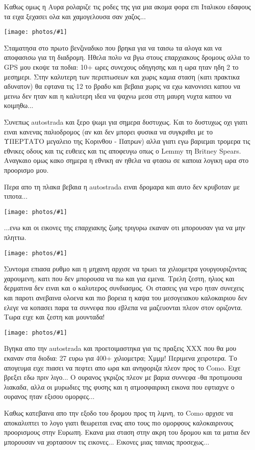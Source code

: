 \documentclass[]{book}
\newcommand\photo[1]{\noindent\texttt{[image: photos/\#1]}}
\begin{document}
Καθως ομως η Αυρα ρολαριζε τις ροδες της για μια ακομα φορα επι Ιταλικου εδαφους τα ειχα ξεχασει ολα και χαμογελουσα σαν χαζος...

\photo{8.jpg}

Σταματησα στο πρωτο βενζιναδικο που βρηκα για να ταισω τα αλογα και να αποφασισω για τη διαδρομη. Ηθελα πολυ να βγω στους επαρχιακους δρομους αλλα το GPS μου εκοψε τα ποδια: 10+ ωρες συνεχους οδηγησης και η ωρα ηταν ηδη 2 το μεσημερι. Στην καλυτερη των περιπτωσεων και χωρις καμια σταση (κατι πρακτικα αδυνατον) θα εφτανα τις 12 το βραδυ και βεβαια χωρις να εχω κανονισει καπου να μεινω δεν ηταν και η καλυτερη ιδεα να ψαχνω μεσα στη μαυρη νυχτα καπου να κοιμηθω...

Συνεπως autostrada και ξερο ψωμι για σημερα δυστυχως.
Και το δυστυχως οχι γιατι ειναι κανενας παλιοδρομος (αν και δεν μπορει φυσικα να συγκριθει με το ΥΠΕΡΤΑΤΟ μεγαλειο της Κορινθου - Πατρων) αλλα γιατι εγω βαριεμαι τρομερα τις εθνικες οδους και τις ευθειες και τις αποφευγω οπως ο Lemmy τη Britney Spears. Αναγκαιο ομως κακο σημερα η εθνικη αν ηθελα να φτασω σε καποια λογικη ωρα στο προορισμο μου.

Περα απο τη πλακα βεβαια η autostrada ειναι δρομαρα και αυτο δεν κρυβοταν με τιποτα...

\photo{9.jpg}

...ενω και οι εικονες της επαρχιακης ζωης τριγυρω εκαναν οτι μπορουσαν για να μην πληττω.

\photo{10.jpg}

Συντομα επιασα ρυθμο και η μηχανη αρχισε να τρωει τα χιλιομετρα γουργουριζοντας χαρουμενη, κατι που δεν μπορουσα να πω και για εμενα. Τρελη ζεστη, ηλιος και δερματινα δεν ειναι και ο καλυτερος συνδιασμος. 
Οι στασεις για νερο ηταν συνεχεις και παροτι ανεβαινα ολοενα και πιο βορεια η καψα του μεσογειακου καλοκαιριου δεν ελεγε να κοπασει παρα τα συννεφα που εβλεπα να μαζευονται πλεον στον οριζοντα. 
Τωρα ειχε και ζεστη και μουνταδα!

\photo{11.jpg}

Βγηκα απο την autostrada και προετοιμαστηκα για τις πραξεις ΧΧΧ που θα μου εκαναν στα διοδια: 27 ευρω για 400+ χιλιομετρα; Χμμμ! Περιμενα χειροτερα.
Το απογευμα ειχε πιασει να πεφτει απο ωρα και ανηφοριζα πλεον προς το Como. Ειχε βρεξει εδω πριν λιγο... Ο ουρανος γκριζος πλεον με βαρια συννεφα -θα προτιμουσα λιακαδα, αλλα οι μυρωδιες της φυσης και η ατμοσφαιρικη εικονα που εφτιαχνε ο ουρανος ηταν εξισου ομορφες...

Καθως κατεβαινα απο την εξοδο του δρομου προς τη λιμνη, το Como αρχισε να αποκαλυπτει το λογο γιατι θεωρειται ενας απο τους πιο ομορφους καλοκαιρινους προορισμους στην Ευρωπη.
Εκανα μια σταση στην ακρη του δρομου και τα ματια δεν μπορουσαν να χορτασουν τις εικονες...
Εικονες μιας ταινιας προσεχως...
\end{document}
